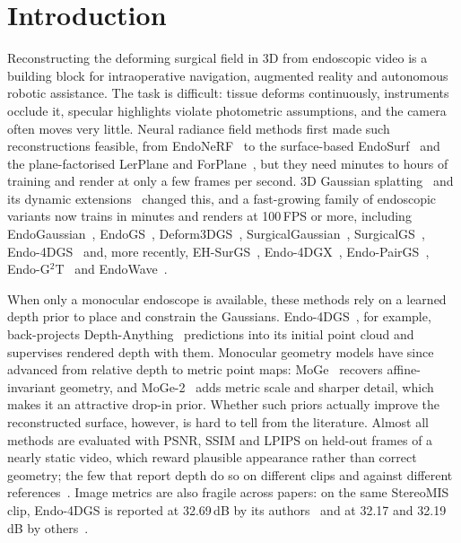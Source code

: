 \documentclass[conference]{IEEEtran}
\begin{document}
\section{Introduction}
Reconstructing the deforming surgical field in 3D from endoscopic video is a building block for intraoperative navigation, augmented reality and autonomous robotic assistance. The task is difficult: tissue deforms continuously, instruments occlude it, specular highlights violate photometric assumptions, and the camera often moves very little. Neural radiance field methods first made such reconstructions feasible, from EndoNeRF~\cite{wang2022endonerf} to the surface-based EndoSurf~\cite{zha2023endosurf} and the plane-factorised LerPlane and ForPlane~\cite{yang2023lerplane,yang2023forplane}, but they need minutes to hours of training and render at only a few frames per second. 3D Gaussian splatting~\cite{kerbl2023gaussian} and its dynamic extensions~\cite{wu2024_4dgs} changed this, and a fast-growing family of endoscopic variants now trains in minutes and renders at 100\,FPS or more, including EndoGaussian~\cite{liu2024endogaussian}, EndoGS~\cite{zhu2024endogs}, Deform3DGS~\cite{yang2024deform3dgs}, SurgicalGaussian~\cite{xie2024surgicalgaussian}, SurgicalGS~\cite{chen2024surgicalgs}, Endo-4DGS~\cite{huang2024endo4dgs} and, more recently, EH-SurGS~\cite{shan2025ehsurgs}, Endo-4DGX~\cite{huang2025endo4dgx}, Endo-PairGS~\cite{yu2026endopairgs}, Endo-G$^2$T~\cite{liu2025endog2t} and EndoWave~\cite{wu2025endowave}.

When only a monocular endoscope is available, these methods rely on a learned depth prior to place and constrain the Gaussians. Endo-4DGS~\cite{huang2024endo4dgs}, for example, back-projects Depth-Anything~\cite{yang2024depthanything} predictions into its initial point cloud and supervises rendered depth with them. Monocular geometry models have since advanced from relative depth to metric point maps: MoGe~\cite{wang2025moge} recovers affine-invariant geometry, and MoGe-2~\cite{wang2025moge2} adds metric scale and sharper detail, which makes it an attractive drop-in prior. Whether such priors actually improve the reconstructed surface, however, is hard to tell from the literature. Almost all methods are evaluated with PSNR, SSIM and LPIPS on held-out frames of a nearly static video, which reward plausible appearance rather than correct geometry; the few that report depth do so on different clips and against different references~\cite{chen2024surgicalgs,song2026diff2dgs}. Image metrics are also fragile across papers: on the same StereoMIS~\cite{hayoz2023stereomis} clip, Endo-4DGS is reported at 32.69\,dB by its authors~\cite{huang2024endo4dgs} and at 32.17 and 32.19\,dB by others~\cite{yu2026endopairgs,liu2025endog2t}.
\end{document}
